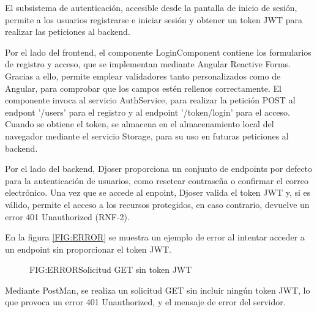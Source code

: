 El subsistema de autenticación, accesible desde la pantalla de inicio de sesión, permite a los usuarios registrarse e iniciar sesión
y obtener un token JWT para realizar las peticiones al backend. 

Por el lado del frontend, el componente LoginComponent contiene los formularios 
de registro y acceso, que se implementan mediante Angular Reactive Forms. Gracias a ello, permite emplear validadores tanto personalizados como de 
Angular, para comprobar que los campos estén rellenos correctamente. El componente invoca al servicio AuthService, para realizar la petición POST
al endpont '/users' para el registro y al endpoint '/token/login' para el acceso. Cuando se obtiene el token, se almacena 
en el almacenamiento local del navegador mediante el servicio Storage, para su uso en futuras peticiones al backend. 


Por el lado del backend, Djoser proporciona un conjunto de endpoints por defecto para la autenticación de usuarios, como resetear contraseña 
o confirmar el correo electrónico. Una vez que se accede al enpoint, Djoser valida el token JWT y, si es válido, permite el acceso a los recursos protegidos, 
en caso contrario, devuelve un error 401 Unauthorized (RNF-2).

En la figura \ref{FIG:ERROR}
se muestra un ejemplo de error al intentar acceder a un endpoint sin proporcionar el token JWT.

\begin{figure}[Prueba PostMan]{FIG:ERROR}{Solicitud GET sin token JWT}
\end{figure}

Mediante PostMan, se realiza un solicitud GET sin incluir ningún token JWT, lo que provoca un error 401 Unauthorized, y el mensaje de error 
del servidor.